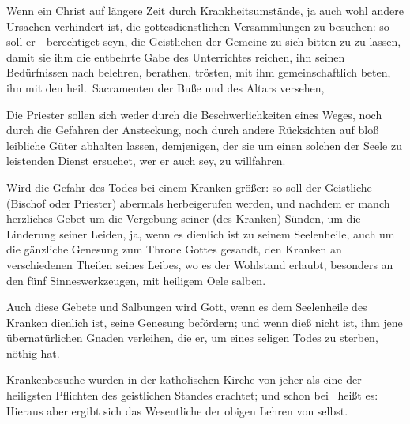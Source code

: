 \begin{aufza}
\item Wenn ein Christ auf längere Zeit durch Krankheitsumstände, ja auch wohl andere Ursachen verhindert ist, die gottesdienstlichen Versammlungen zu besuchen: so soll er~\ berechtiget seyn, die Geistlichen der Gemeine zu sich bitten zu zu lassen, damit sie ihm die entbehrte Gabe des Unterrichtes reichen, ihn seinen Bedürfnissen nach belehren, berathen, trösten, mit ihm gemeinschaftlich beten, ihn mit den heil.\ Sacramenten der Buße und des Altars versehen, \usw\
\item Die Priester sollen sich weder durch die Beschwerlichkeiten eines Weges, noch durch die Gefahren der Ansteckung, noch durch andere Rücksichten auf bloß leibliche Güter abhalten lassen, demjenigen, der sie um einen solchen der Seele zu leistenden Dienst ersuchet, wer er auch sey, zu willfahren.
\item Wird die Gefahr des Todes bei einem Kranken größer: so soll der Geistliche (Bischof oder Priester) abermals herbeigerufen werden, und nachdem er manch herzliches Gebet um die Vergebung seiner (des Kranken) Sünden, um die Linderung seiner Leiden, ja, wenn es dienlich ist zu seinem Seelenheile, auch um die gänzliche Genesung zum Throne Gottes gesandt, den Kranken an verschiedenen Theilen seines Leibes, wo es der Wohlstand erlaubt, besonders an den fünf Sinneswerkzeugen, mit heiligem Oele salben.
\item Auch diese Gebete und Salbungen wird Gott, wenn es dem Seelenheile des Kranken dienlich ist, seine Genesung befördern; und wenn dieß nicht ist, ihm jene übernatürlichen Gnaden verleihen, die er, um eines seligen Todes zu sterben, nöthig hat.
\end{aufza}

Krankenbesuche wurden in der katholischen Kirche von jeher als eine der heiligsten Pflichten des geistlichen Standes erachtet; und schon bei \ heißt es:  Hieraus aber ergibt sich das Wesentliche der obigen Lehren von selbst.~

